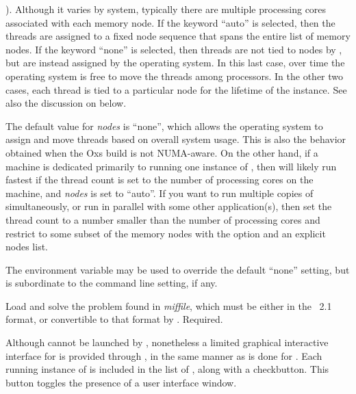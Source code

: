 \begin{description}
  ).  Although it varies by system, typically there are
  multiple processing cores associated with each memory node.  If the
  keyword ``auto'' is selected, then the threads are assigned to a
  fixed node sequence that spans the entire list of memory nodes.  If
  the keyword ``none'' is selected, then threads are not tied to nodes
  by , but are instead assigned by the operating system.
  In this last case, over time the operating system is free to move
  the threads among processors.  In the other two cases, each thread
  is tied to a particular node for the lifetime of the 
  instance.  See also the discussion on  below.

  The default value for \textit{nodes} is ``none'', which allows the
  operating system to assign and move threads based on overall system
  usage.  This is also the behavior obtained when the Oxs build is not
  NUMA-aware.  On the other hand, if a machine is dedicated primarily
  to running one instance of , then  will
  likely run fastest if the thread count is set to the number of
  processing cores on the machine, and \textit{nodes} is set to
  ``auto''.  If you want to run multiple copies of 
  simultaneously, or run  in parallel with some other
  application(s), then set the thread count to a number smaller than
  the number of processing cores and restrict  to some
  subset of the memory nodes with the  option and an
  explicit nodes list.

  The environment variable
  may be used to override the default ``none'' setting, but is
  subordinate to the command line setting, if any.
\item[\optkey{miffile}]
  Load and solve the problem found in {\em miffile}, which must be
  either in the \MIF~2.1 format, or convertible to that format by 
  .  Required.
\end{description}

Although  cannot be
launched by , nonetheless
a limited graphical interactive interface for  is provided
through , in the same manner as is done for .
Each running instance of  is included in the
 list of , along with a
checkbutton.  This button toggles the presence of a user interface
window.

